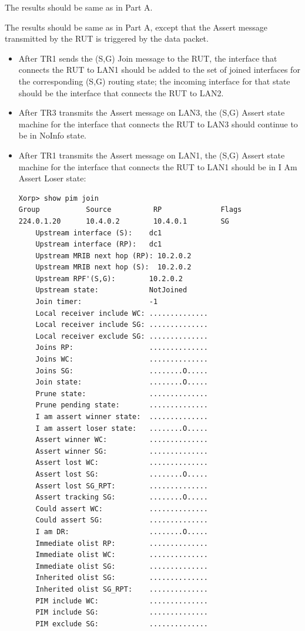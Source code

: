 \documentclass[11pt]{report}
\begin{document}

The results should be same as in Part A.


The results should be same as in Part A, except that the Assert message
transmitted by the RUT is triggered by the data packet.


\begin{itemize}

  \item After TR1 sends the (S,G) Join message to the RUT, the interface that
  connects the RUT to LAN1 should be added to the set of joined interfaces for
  the corresponding (S,G) routing state; the incoming interface for that state
  should be the interface that connects the RUT to LAN2.

  \item After TR3 transmits the Assert message on LAN3, the (S,G) Assert state
  machine for the interface that connects the RUT to LAN3 should continue to
  be in NoInfo state.

  \item After TR1 transmits the Assert message on LAN1, the (S,G) Assert state
  machine for the interface that connects the RUT to LAN1 should be in I Am
  Assert Loser state:

\begin{verbatim}
Xorp> show pim join 
Group           Source          RP              Flags
224.0.1.20      10.4.0.2        10.4.0.1        SG   
    Upstream interface (S):    dc1
    Upstream interface (RP):   dc1
    Upstream MRIB next hop (RP): 10.2.0.2
    Upstream MRIB next hop (S):  10.2.0.2
    Upstream RPF'(S,G):        10.2.0.2
    Upstream state:            NotJoined 
    Join timer:                -1
    Local receiver include WC: ..............
    Local receiver include SG: ..............
    Local receiver exclude SG: ..............
    Joins RP:                  ..............
    Joins WC:                  ..............
    Joins SG:                  ........O.....
    Join state:                ........O.....
    Prune state:               ..............
    Prune pending state:       ..............
    I am assert winner state:  ..............
    I am assert loser state:   ........O.....
    Assert winner WC:          ..............
    Assert winner SG:          ..............
    Assert lost WC:            ..............
    Assert lost SG:            ........O.....
    Assert lost SG_RPT:        ..............
    Assert tracking SG:        ........O.....
    Could assert WC:           ..............
    Could assert SG:           ..............
    I am DR:                   ........O.....
    Immediate olist RP:        ..............
    Immediate olist WC:        ..............
    Immediate olist SG:        ..............
    Inherited olist SG:        ..............
    Inherited olist SG_RPT:    ..............
    PIM include WC:            ..............
    PIM include SG:            ..............
    PIM exclude SG:            ..............
\end{verbatim}


\end{itemize}
\end{document}
